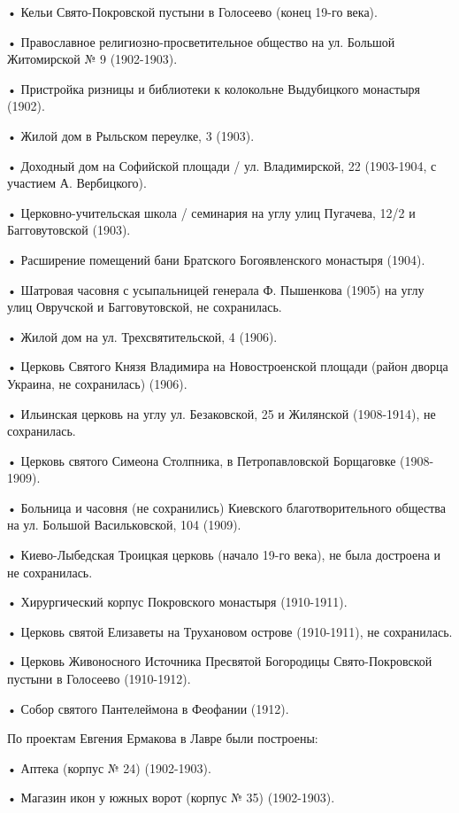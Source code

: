 \noindent • Кельи Свято-Покровской пустыни в Голосеево (конец 19-го века).

\noindent • Православное религиозно-просветительное общество на ул. Большой Житомирской № 9 (1902-1903).

\noindent • Пристройка ризницы и библиотеки к колокольне Выдубицкого монастыря (1902).

\noindent • Жилой дом в Рыльском переулке, 3 (1903).

\noindent • Доходный дом на Софийской площади / ул. Владимирской, 22 (1903-1904, с участием А. Вербицкого).

\noindent • Церковно-учительская школа / семинария на углу улиц Пугачева, 12/2 и Багговутовской (1903).

\noindent • Расширение помещений бани Братского Богоявленского монастыря (1904).

\noindent • Шатровая часовня с усыпальницей генерала Ф. Пышенкова (1905) на углу улиц Овручской и Багговутовской, не сохранилась.

\noindent • Жилой дом на ул. Трехсвятительской, 4 (1906).

\noindent • Церковь Святого Князя Владимира на Новостроенской площади (район дворца Украина, не сохранилась) (1906).

\noindent • Ильинская церковь на углу ул. Безаковской, 25 и Жилянской (1908-1914), не сохранилась.

\noindent • Церковь святого Симеона Столпника, в Петропавловской Борщаговке (1908-1909).

\noindent • Больница и часовня (не сохранились) Киевского благотворительного общества на ул. 
Большой Васильковской, 104 (1909).

\noindent • Киево-Лыбедская Троицкая церковь (начало 19-го века), не была достроена и не сохранилась.

\noindent • Хирургический корпус Покровского монастыря (1910-1911).

\noindent • Церковь святой Елизаветы на Трухановом острове (1910-1911), не сохранилась.

\noindent • Церковь Живоносного Источника Пресвятой Богородицы Свято-Покровской пустыни в Голосеево (1910-1912).

\noindent • Собор святого Пантелеймона в Феофании (1912).

По проектам Евгения Ермакова в Лавре были построены:

\noindent • Аптека (корпус № 24) (1902-1903).

\noindent • Магазин икон у южных ворот (корпус № 35) (1902-1903).

